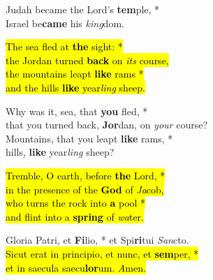 
Judah became the Lord’s \textbf{tem}ple, *\\
Israel be\textbf{came} his \emph{king}dom.

\hl{The sea fled at \textbf{the} sight: *\\
the Jordan turned \textbf{back} on \emph{its} course,\\
the mountains leapt \textbf{like} rams *\\
and the hills \textbf{like} year\emph{ling} sheep.}

Why was it, sea, that \textbf{you} fled, *\\
that you turned back, \textbf{Jor}dan, on \emph{your} course?\\
Mountains, that you leapt \textbf{like} rams, *\\
hills, \textbf{like} year\emph{ling} sheep?

\hl{Tremble, O earth, before \textbf{the} Lord, *\\
in the presence of the \textbf{God} of \emph{Ja}cob,\\
who turns the rock into \textbf{a} pool *\\
and flint into a \textbf{spring} of \emph{wa}ter.}

Gloria Patri, et \textbf{Fi}lio, * et Spi\textbf{ri}tui \emph{San}cto. \\
\hl{Sicut erat in principio, et nunc, et \textbf{sem}per, *\\
et in saecula saecu\textbf{lor}um. \emph{A}men.}    
